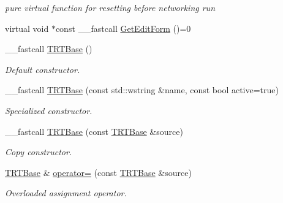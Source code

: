 \begin{DoxyCompactItemize}
\begin{DoxyCompactList}\small\item\em pure virtual function for resetting before networking run \end{DoxyCompactList}\item 
virtual void $\ast$const \+\_\+\+\_\+fastcall \hyperlink{class_t_r_t_base_ab83e520005e20ee71f98f3e85e1ee6d4}{Get\+Edit\+Form} ()=0
\item 
\hypertarget{class_t_r_t_base_a5d257475501e327079c06858de645854}{\+\_\+\+\_\+fastcall \hyperlink{class_t_r_t_base_a5d257475501e327079c06858de645854}{T\+R\+T\+Base} ()}\label{class_t_r_t_base_a5d257475501e327079c06858de645854}

\begin{DoxyCompactList}\small\item\em Default constructor. \end{DoxyCompactList}\item 
\hypertarget{class_t_r_t_base_ac1b2d91a880b9cf6d951980c85b6d672}{\+\_\+\+\_\+fastcall \hyperlink{class_t_r_t_base_ac1b2d91a880b9cf6d951980c85b6d672}{T\+R\+T\+Base} (const std\+::wstring \&name, const bool active=true)}\label{class_t_r_t_base_ac1b2d91a880b9cf6d951980c85b6d672}

\begin{DoxyCompactList}\small\item\em Specialized constructor. \end{DoxyCompactList}\item 
\hypertarget{class_t_r_t_base_a2f4e179ec98c38249da18d437965a4a7}{\+\_\+\+\_\+fastcall \hyperlink{class_t_r_t_base_a2f4e179ec98c38249da18d437965a4a7}{T\+R\+T\+Base} (const \hyperlink{class_t_r_t_base}{T\+R\+T\+Base} \&source)}\label{class_t_r_t_base_a2f4e179ec98c38249da18d437965a4a7}

\begin{DoxyCompactList}\small\item\em Copy constructor. \end{DoxyCompactList}\item 
\hypertarget{class_t_r_t_base_aef9192c65718aedd3bbd90ddb397b364}{\hyperlink{class_t_r_t_base}{T\+R\+T\+Base} \& \hyperlink{class_t_r_t_base_aef9192c65718aedd3bbd90ddb397b364}{operator=} (const \hyperlink{class_t_r_t_base}{T\+R\+T\+Base} \&source)}\label{class_t_r_t_base_aef9192c65718aedd3bbd90ddb397b364}

\begin{DoxyCompactList}\small\item\em Overloaded assignment operator. \end{DoxyCompactList}\end{DoxyCompactItemize}
